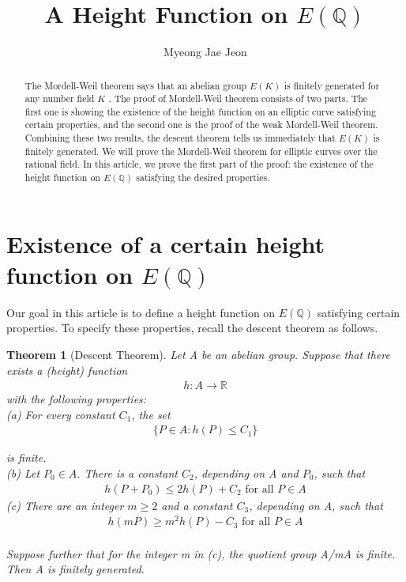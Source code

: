 \documentclass[11pt]{article}
\title{A Height Function on \(E(\mathbb{Q})\)}
\author{Myeong Jae Jeon}
\date{}
\newcommand{\<}{\langle}
\renewcommand{\>}{\rangle}
\numberwithin{equation}{section}
\theoremstyle{plain}
\newtheorem{thm}{Theorem}[section]
\theoremstyle{definition}
\begin{document}
\maketitle

\begin{abstract}
The Mordell-Weil theorem says that an abelian group \(E(K)\) is finitely generated for any number field \(K\) . The proof of Mordell-Weil theorem consists of two parts. The first one is showing the existence of the height function on an elliptic curve satisfying certain properties, and the second one is the proof of the weak Mordell-Weil theorem. Combining these two results, the descent theorem tells us immediately that \(E(K)\) is finitely generated. We will prove the Mordell-Weil theorem for elliptic curves over the rational field. In this article, we prove the first part of the proof: the existence of the height function on \(E(\mathbb{Q})\) satisfying the desired properties. 
\end{abstract}

\section{Existence of a certain height function on \(E(\mathbb{Q})\)} \label{section-E}

Our goal in this article is to define a height function on \(E(\mathbb{Q})\) satisfying certain properties. To specify these properties, recall the descent theorem as follows.

\begin{thm}[Descent Theorem]
 Let A be an abelian group. Suppose that there exists a (height) function
    \begin{align*}
        h:A \xrightarrow{} \mathbb{R}
    \end{align*}
    with the following properties: \\
    (a) For every constant \(C_1\), the set
        \begin{gather*}
            \{P \in A : h(P) \leq C_1\}
        \end{gather*} 
            \par is finite. \\
    (b) Let \(P_0 \in A\). There is a constant \(C_2\), depending on A and \(P_0\), such that
        \begin{gather*}
            h(P+ P_0) \leq 2h(P) + C_2 \text{  for all \(P \in A\)}
        \end{gather*}
    (c) There are an integer \(m \geq 2\) and a constant \(C_3\), depending on A, such that
        \begin{gather*}
            h(mP) \geq m^2 h(P) - C_3 \text{  for all \(P \in A\)}
        \end{gather*} \\
    Suppose further that for the integer m in (c), the quotient group A/mA is finite. Then A is finitely generated.
\end{thm}
\end{document}
